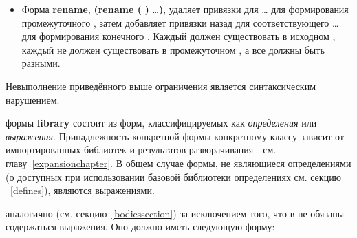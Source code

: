 \begin{itemize}
\item Форма {\cf\bfseries rename}, {\cf \textbf{(rename (}
  \textbf{)} \ldots\textbf{)}}, удаляет привязки для {\cf
   \ldots} для формирования промежуточного , затем
  добавляет привязки назад для соответствующего {\cf {} \ldots} для
  формирования конечного . Каждый  должен существовать в исходном
  , каждый  не должен существовать в промежуточном
  , а все  должны быть разными.
\end{itemize}\vspace{1mm}
Невыполнение приведённого выше ограничения является синтаксическим нарушением.\vspace{1mm}

\label{librarybodysection}
 формы {\cf\bfseries library} состоит из форм, классифицируемых как
\textit{определения} или
\textit{выражения}. Принадлежность конкретной формы конкретному классу
зависит от импортированных библиотек и результатов
разворачивания---см. главу~\ref{expansionchapter}. В общем случае формы, не являющиеся
определениями (о доступных при использовании базовой
библиотеки определениях см. секцию ~\ref{defines}), являются выражениями.\vspace{1mm}

 аналогично  (см. секцию~\ref{bodiessection}) за исключением
того, что в  не обязаны содержаться выражения. Оно должно иметь следующую
форму:\vspace{1mm}

